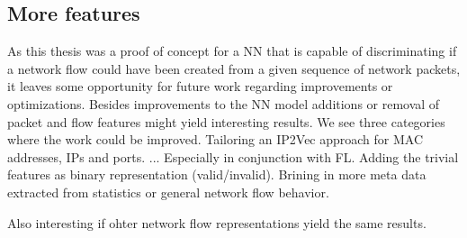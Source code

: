 \documentclass[
	ngerman,
	ruledheaders=section,%
	class=report,%
	thesis={type=bachelor},%
	accentcolor=9c,%
	custommargins=true,%
	marginpar=false,%
	parskip=half-,%
	fontsize=11pt,%
]{tudapub}
\begin{document}
\subsection{More features}

As this thesis was a proof of concept for a NN that is capable of discriminating if a network flow could have been created from a given sequence of network packets, it leaves some opportunity for future work regarding improvements or optimizations.
Besides improvements to the NN model additions or removal of packet and flow features might yield interesting results.
We see three categories where the work could be improved.
Tailoring an IP2Vec approach for MAC addresses, IPs and ports. ...
Especially in conjunction with FL.
Adding the trivial features as binary representation (valid/invalid).
Brining in more meta data extracted from statistics or general network flow behavior.

Also interesting if ohter network flow representations yield the same results.

\printbibliography
\end{document}
